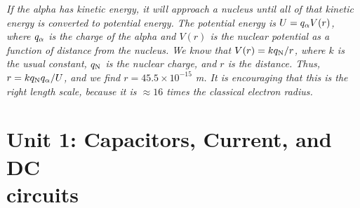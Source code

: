 \documentclass[12pt,twocolumn]{article}
\begin{document}
\begin{enumerate}
\textit{If the alpha has kinetic energy, it will approach a nucleus until all of that kinetic energy is converted to potential energy.  The potential energy is $U = q_{\rm \alpha} V(r)$, where $q_{\rm \alpha}$ is the charge of the alpha and $V(r)$ is the nuclear potential as a function of distance from the nucleus.  We know that $V(r) = kq_{\rm N}/r$, where $k$ is the usual constant, $q_{\rm N}$ is the nuclear charge, and $r$ is the distance.  Thus, $r = k q_{\rm N} q_{\rm \alpha} / U$, and we find $r = 45.5 \times 10^{-15}$ m.  It is encouraging that this is the right length scale, because it is $\approx 16$ times the classical electron radius.}
\end{enumerate}

\section{Unit 1: Capacitors, Current, and DC \\ circuits}
\end{document}
